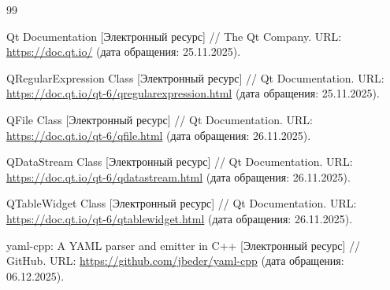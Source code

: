 \begin{thebibliography}{99}

Qt Documentation [Электронный ресурс] // The Qt Company. URL: \url{https://doc.qt.io/} (дата обращения: 25.11.2025).

QRegularExpression Class [Электронный ресурс] // Qt Documentation. URL: \url{https://doc.qt.io/qt-6/qregularexpression.html} (дата обращения: 25.11.2025).

QFile Class [Электронный ресурс] // Qt Documentation. URL: \url{https://doc.qt.io/qt-6/qfile.html} (дата обращения: 26.11.2025).

QDataStream Class [Электронный ресурс] // Qt Documentation. URL: \url{https://doc.qt.io/qt-6/qdatastream.html} (дата обращения: 26.11.2025).

QTableWidget Class [Электронный ресурс] // Qt Documentation. URL: \url{https://doc.qt.io/qt-6/qtablewidget.html} (дата обращения: 26.11.2025).

yaml-cpp: A YAML parser and emitter in C++ [Электронный ресурс] // GitHub. URL: \url{https://github.com/jbeder/yaml-cpp} (дата обращения: 06.12.2025).

\end{thebibliography}